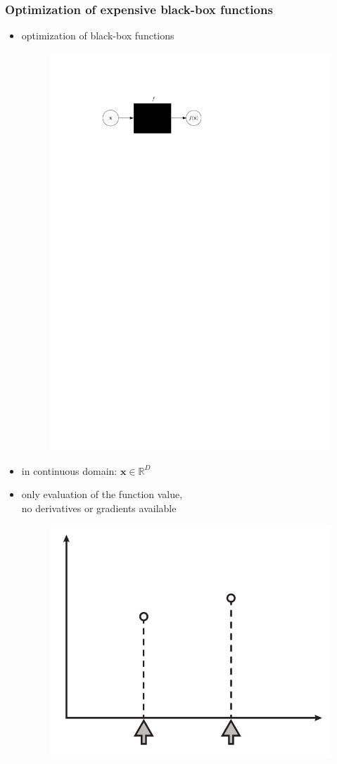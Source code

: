 \documentclass[sans,mathserif]{beamer}
\newcommand{\xx}{\mathrm{\mathbf{x}}}
\begin{document}
\begin{frame}
  \frametitle{Optimization of expensive black-box functions}
  \begin{itemize}[<+->]
    \item optimization of black-box functions
      \begin{figure}
      \includegraphics[width=0.4\linewidth]{img/black-box-function}
      \end{figure}
    \item in continuous domain: $\xx \in \mathbb{R}^D$
    \item only evaluation of the function value, \\
      \alert{no derivatives} or gradients available
      \begin{figure}
      \includegraphics[width=0.4\linewidth]{img/black-box-samples}
      \end{figure}
  \end{itemize}
\end{frame}
\end{document}
